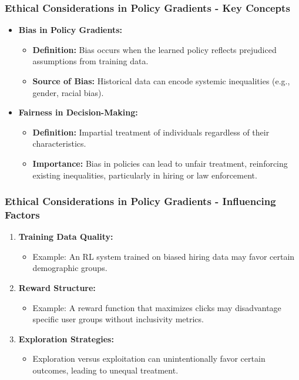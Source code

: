 \documentclass{beamer}
\begin{document}
\begin{frame}[fragile]
    \frametitle{Ethical Considerations in Policy Gradients - Key Concepts}
    \begin{itemize}
        \item \textbf{Bias in Policy Gradients:}
            \begin{itemize}
                \item \textbf{Definition:} Bias occurs when the learned policy reflects prejudiced assumptions from training data.
                \item \textbf{Source of Bias:} Historical data can encode systemic inequalities (e.g., gender, racial bias).
            \end{itemize}
        
        \item \textbf{Fairness in Decision-Making:}
            \begin{itemize}
                \item \textbf{Definition:} Impartial treatment of individuals regardless of their characteristics.
                \item \textbf{Importance:} Bias in policies can lead to unfair treatment, reinforcing existing inequalities, particularly in hiring or law enforcement.
            \end{itemize}
    \end{itemize}
\end{frame}

\begin{frame}[fragile]
    \frametitle{Ethical Considerations in Policy Gradients - Influencing Factors}
    \begin{enumerate}
        \item \textbf{Training Data Quality:}
            \begin{itemize}
                \item Example: An RL system trained on biased hiring data may favor certain demographic groups.
            \end{itemize}
        
        \item \textbf{Reward Structure:}
            \begin{itemize}
                \item Example: A reward function that maximizes clicks may disadvantage specific user groups without inclusivity metrics.
            \end{itemize}
        
        \item \textbf{Exploration Strategies:}
            \begin{itemize}
                \item Exploration versus exploitation can unintentionally favor certain outcomes, leading to unequal treatment.
            \end{itemize}
    \end{enumerate}
\end{frame}
\end{document}
